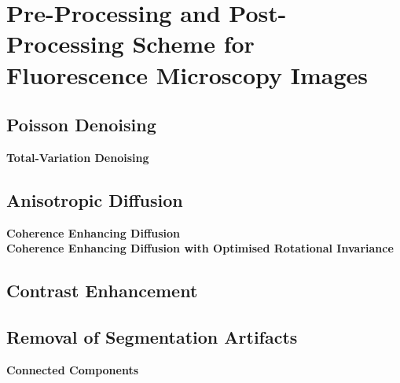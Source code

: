 
\chapter{Pre-Processing and Post-Processing Scheme for Fluorescence Microscopy Images} %

\label{chap:Chapter7} %


\section{Poisson Denoising}
\label{sec:PoissonDenoising}

\textbf{Total-Variation Denoising}


\section{Anisotropic Diffusion}
\label{sec:Diffusion}

\textbf{Coherence Enhancing Diffusion}\\
\textbf{Coherence Enhancing Diffusion with Optimised Rotational Invariance}


\section{Contrast Enhancement}
\label{sec:ContrastEnhancement}


\section{Removal of Segmentation Artifacts}
\label{sec:RemovalArtifacts}

\textbf{Connected Components}

